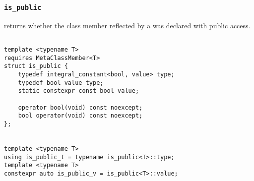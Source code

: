 
\subsubsection{\texttt{is\_public}}

returns whether the class member reflected by a  was declared with public access.

\begin{verbatim}

template <typename T>
requires MetaClassMember<T>
struct is_public {
	typedef integral_constant<bool, value> type;
	typedef bool value_type;
	static constexpr const bool value;

	operator bool(void) const noexcept;
	bool operator(void) const noexcept;
};


template <typename T>
using is_public_t = typename is_public<T>::type;
template <typename T>
constexpr auto is_public_v = is_public<T>::value;

\end{verbatim}
